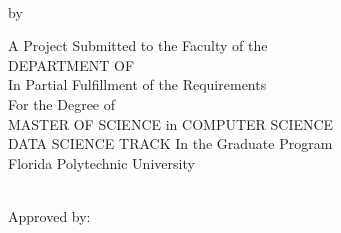 %
%
%

\pagestyle{empty}
\begin{center}
	{{\bfseries\large{\MakeUppercase{\thesisTitle} \\}}\par}
	\vspace*{5mm}
	{by\\\vspace*{2mm}\textsc{\thesisBy}\par}
	\vspace*{5mm}
	A Project Submitted to the Faculty of the \\
	DEPARTMENT OF {\MakeUppercase{\thesisDegreeDepartment}}\\
	In Partial Fulfillment of the Requirements\\
	For the Degree of\\
	MASTER OF SCIENCE in COMPUTER SCIENCE\\ 
	DATA SCIENCE TRACK
	In the Graduate Program\\\vspace*{1.5mm}
	Florida Polytechnic University\\\vspace*{5mm}
	\small  \thesisDate \\\vspace*{1.5mm}
	\vfill
	\begin{flushleft}
		Approved by:\\
	\end{flushleft}
\end{center}
\pagebreak